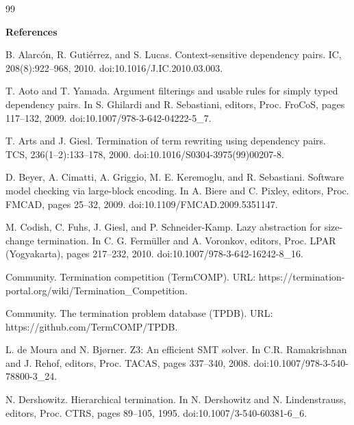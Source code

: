 \documentclass[10pt,a4paper]{amsart}
\begin{document}
\begin{thebibliography}{99}

 
\par\medskip\noindent\textbf{References}\par
  
\par\noindent  [1]  B. Alarcón, R. Gutiérrez, and S. Lucas.  Context-sensitive dependency pairs.  IC, 208(8):922–968, 2010.  doi:10.1016/J.IC.2010.03.003.  
 
\par\noindent  [2]  T. Aoto and T. Yamada.  Argument filterings and usable rules for simply typed dependency pairs.  In S. Ghilardi and R. Sebastiani, editors, Proc. FroCoS, pages 117–132, 2009.  doi:10.1007/978-3-642-04222-5\_7.  
 
\par\noindent  [3]  T. Arts and J. Giesl.  Termination of term rewriting using dependency pairs.  TCS, 236(1–2):133–178, 2000.  doi:10.1016/S0304-3975(99)00207-8.  
 
\par\noindent  [4]  D. Beyer, A. Cimatti, A. Griggio, M. E. Keremoglu, and R. Sebastiani.  Software model checking via large-block encoding.  In A. Biere and C. Pixley, editors, Proc. FMCAD, pages 25–32, 2009.  doi:10.1109/FMCAD.2009.5351147.  
 
\par\noindent  [5]  M. Codish, C. Fuhs, J. Giesl, and P. Schneider-Kamp.  Lazy abstraction for size-change termination.  In C. G. Fermüller and A. Voronkov, editors, Proc. LPAR (Yogyakarta), pages 217–232, 2010.  doi:10.1007/978-3-642-16242-8\_16.  
 
\par\noindent  [6]  Community.  Termination competition (TermCOMP).  URL: https://termination-portal.org/wiki/Termination\_Competition.  
 
\par\noindent  [7]  Community.  The termination problem database (TPDB).  URL: https://github.com/TermCOMP/TPDB.  
 
\par\noindent  [8]  L. de Moura and N. Bjørner.  Z3: An efficient SMT solver.  In C.R. Ramakrishnan and J. Rehof, editors, Proc. TACAS, pages 337–340, 2008.  doi:10.1007/978-3-540-78800-3\_24.  
 
\par\noindent  [9]  N. Dershowitz.  Hierarchical termination.  In N. Dershowitz and N. Lindenstrauss, editors, Proc. CTRS, pages 89–105, 1995.  doi:10.1007/3-540-60381-6\_6.  
 

\end{thebibliography}
\end{document}
